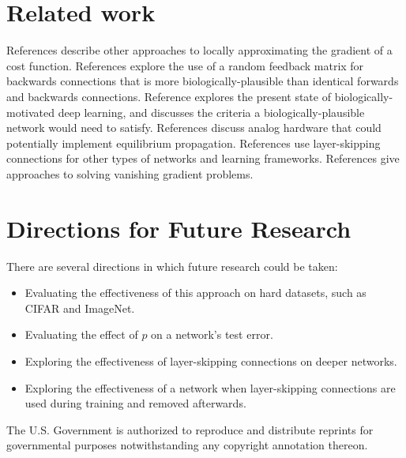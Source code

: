 \documentclass[format=sigconf]{acmart}
\begin{document}
\section{Related work}
References \cite{lee2015, xie2003, pineda1987} describe other approaches to locally approximating the gradient of a cost function. References \cite{lillicrap2014, @crafton2019} explore the use of a random feedback matrix for backwards connections that is more biologically-plausible than identical forwards and backwards connections. Reference \cite{bartunov2018} explores the present state of biologically-motivated deep learning, and \cite{bengio2015} discusses the criteria a biologically-plausible network would need to satisfy. References \cite{shainline2019, davies2018, nahmias2013} discuss analog hardware that could potentially implement equilibrium propagation. References \cite{he2015, srivastava2015, xiaohu2011, krishnan2019} use layer-skipping connections for other types of networks and learning frameworks. References \cite{ioffe2015, glorot2010} give approaches to solving vanishing gradient problems.

\section{Directions for Future Research}

There are several directions in which future research could be taken:
\begin{itemize} 
\item Evaluating the effectiveness of this approach on hard datasets, such as CIFAR and ImageNet.
\item Evaluating the effect of $p$ on a network's test error.
\item Exploring the effectiveness of layer-skipping connections on deeper networks.
\item Exploring the effectiveness of a network when layer-skipping connections are used during training and removed afterwards.
\end{itemize}




The U.S. Government is authorized to reproduce and distribute reprints for governmental purposes notwithstanding any copyright annotation thereon.



\end{document}
